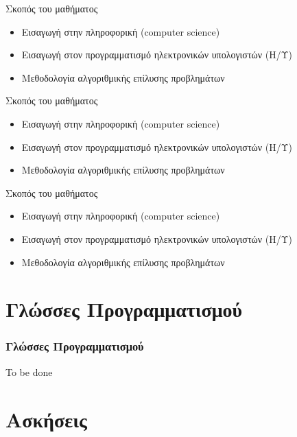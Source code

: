 \documentclass{beamer}
\begin{document}
\begin{frame}
	{\large Σκοπός του μαθήματος}
	\begin{itemize}
		\item Εισαγωγή στην {\color{violet}πληροφορική} (computer science)
		\item Εισαγωγή στον {\color{violet}προγραμματισμό} ηλεκτρονικών
			υπολογιστών (Η/Υ)
		\item Μεθοδολογία {\color{violet}αλγοριθμικής επίλυσης προβλημάτων}
	\end{itemize}
\end{frame}

\begin{frame}
	{\large Σκοπός του μαθήματος}
	\begin{itemize}
		\item Εισαγωγή στην {\color{violet}πληροφορική} (computer science)
		\item Εισαγωγή στον {\color{violet}προγραμματισμό} ηλεκτρονικών
			υπολογιστών (Η/Υ)
		\item Μεθοδολογία {\color{violet}αλγοριθμικής επίλυσης προβλημάτων}
	\end{itemize}
\end{frame}

\begin{frame}
	{\large Σκοπός του μαθήματος}
	\begin{itemize}
		\item Εισαγωγή στην {\color{violet}πληροφορική} (computer science)
		\item Εισαγωγή στον {\color{violet}προγραμματισμό} ηλεκτρονικών
			υπολογιστών (Η/Υ)
		\item Μεθοδολογία {\color{violet}αλγοριθμικής επίλυσης προβλημάτων}
	\end{itemize}
\end{frame}


\section{Γλώσσες Προγραμματισμού}
\begin{frame}
	\frametitle{Γλώσσες Προγραμματισμού}
  To be done
\end{frame}

\section{Ασκήσεις}
\end{document}
